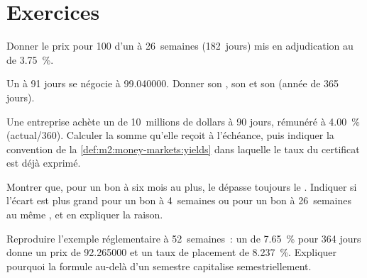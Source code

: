 \section{Exercices}

\begin{exercise}[$\star$]\label{exo:m2:money-markets:1}
Donner le prix pour 100 d'un  à 26~semaines (182~jours) mis en
adjudication au  de 3.75~\%.
\end{exercise}

\begin{exercise}[$\star$]\label{exo:m2:money-markets:2}
Un  à 91 jours se négocie à 99.040000. Donner son , son 
et son  (année de 365 jours).
\end{exercise}

\begin{exercise}[$\star$]\label{exo:m2:money-markets:3}
Une entreprise achète un  de 10~millions de dollars à 90 jours, rémunéré à 4.00~\% (actual/360).
Calculer la somme qu'elle reçoit à l'échéance, puis indiquer la convention de la
\cref{def:m2:money-markets:yields} dans laquelle le taux du certificat est déjà exprimé.
\end{exercise}

\begin{exercise}[$\star\star$]\label{exo:m2:money-markets:4}
Montrer que, pour un bon à six mois au plus, le  dépasse toujours
le . Indiquer si l'écart est plus grand pour un bon à 4~semaines ou pour un bon à
26~semaines au même , et en expliquer la raison.
\end{exercise}

\begin{exercise}[$\star\star$]\label{exo:m2:money-markets:5}
Reproduire l'exemple réglementaire à 52~semaines~: un  de 7.65~\% pour
364 jours donne un prix de 92.265000 et un taux de placement de 8.237~\%. Expliquer
pourquoi la formule au-delà d'un semestre capitalise semestriellement.
\end{exercise}

